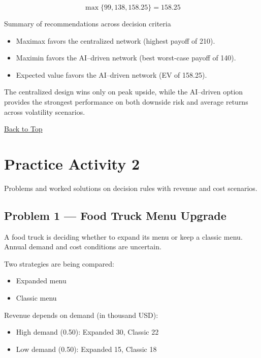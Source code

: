 \[
\max\{99, 138, 158.25\} = 158.25
\]

Summary of recommendations across decision criteria

\begin{itemize}
	\item Maximax favors the centralized network (highest payoff of 210).
	\item Maximin favors the AI--driven network (best worst-case payoff of 140).
	\item Expected value favors the AI--driven network (EV of 158.25).
\end{itemize}

The centralized design wins only on peak upside, while the AI--driven option provides the strongest performance on
both downside risk and average returns across volatility scenarios.

\vspace{6pt}
\noindent\hyperref[table-of-contents]{Back to Top}

\section{Practice Activity 2}\label{sec:practice-activity-2}

Problems and worked solutions on decision rules with revenue and cost scenarios.

\subsection{Problem 1 --- Food Truck Menu Upgrade}\label{subsec:practice-activity-2-problem-1}

A food truck is deciding whether to expand its menu or keep a classic menu. Annual demand and cost conditions are uncertain.

Two strategies are being compared:

\begin{itemize}
	\item Expanded menu
	\item Classic menu
\end{itemize}

Revenue depends on demand (in thousand USD):

\begin{itemize}
	\item High demand (0.50): Expanded 30, Classic 22
	\item Low demand (0.50): Expanded 15, Classic 18
\end{itemize}

